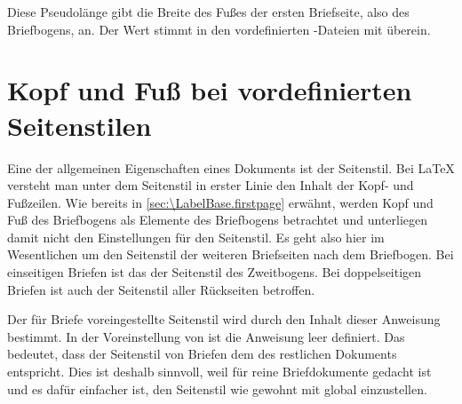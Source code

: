 \begin{Declaration}
\end{Declaration}
Diese Pseudolänge gibt die Breite des Fußes der ersten Briefseite, also des
Briefbogens, an. Der Wert stimmt in den vordefinierten -Dateien mit
%
 überein.%
%
\EndIndexGroup
%
\EndIndexGroup
% 
\EndIndexGroup

\iffree{}{\clearpage}%



\section{Kopf und Fuß bei vordefinierten Seitenstilen}
\BeginIndexGroup
{}

Eine der allgemeinen Eigenschaften eines Dokuments ist der Seitenstil. Bei
{\LaTeX} versteht man unter dem Seitenstil in erster Linie den Inhalt der
Kopf- und Fußzeilen. Wie bereits in
\autoref{sec:\LabelBase.firstpage} erwähnt, werden Kopf und Fuß des Briefbogens
als Elemente des Briefbogens betrachtet und unterliegen damit nicht den
Einstellungen für den Seitenstil. Es geht also hier im Wesentlichen um den
Seitenstil der weiteren Briefseiten nach dem Briefbogen. Bei einseitigen
Briefen ist das der Seitenstil des Zweitbogens. Bei doppelseitigen Briefen ist
auch der Seitenstil aller Rückseiten betroffen.


\begin{Declaration}
\end{Declaration}
Der für Briefe
voreingestellte Seitenstil wird durch den Inhalt dieser Anweisung bestimmt. In
der Voreinstellung von
 ist die Anweisung leer
definiert. Das bedeutet, dass der Seitenstil von Briefen dem des restlichen
Dokuments entspricht. Dies ist deshalb sinnvoll, weil  für
reine Briefdokumente gedacht ist und es dafür einfacher ist, den Seitenstil
wie gewohnt mit  global einzustellen.

